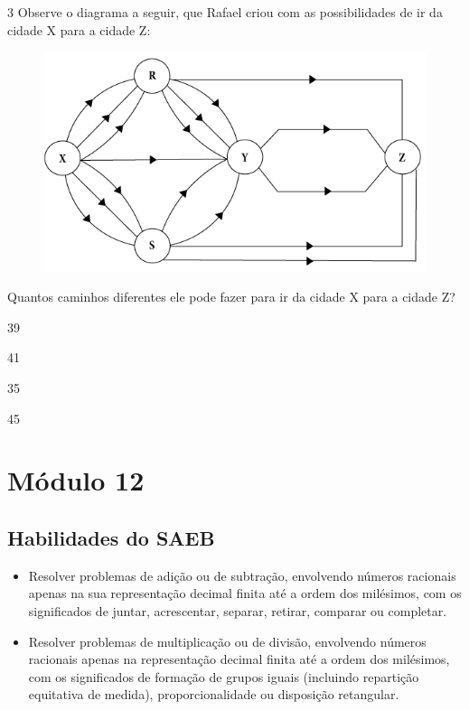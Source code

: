 \pagebreak
\num{3} Observe o diagrama a seguir, que Rafael criou com as possibilidades de ir da cidade X para a cidade Z:

\begin{figure}[htpb!]
\centering
\includegraphics[width=\textwidth]{../ilustracoes/MAT5/SAEB_5ANO_MAT_figura84.png}
\end{figure}

Quantos caminhos diferentes ele pode fazer para ir da cidade X para a
cidade Z?

\begin{minipage}{.5\textwidth}
\begin{escolha}
\item
  39
\item
  41
\item
  35
\item
  45
\end{escolha}
\end{minipage}


\chapter{Módulo 12}

\section*{Habilidades do SAEB}

\begin{itemize}
\item Resolver problemas de adição ou de subtração, envolvendo números
racionais apenas na sua representação decimal finita até a ordem dos
milésimos, com os significados de juntar, acrescentar, separar, retirar,
comparar ou completar.

\item Resolver problemas de multiplicação ou de divisão, envolvendo números
racionais apenas na representação decimal finita até a ordem dos
milésimos, com os significados de formação de grupos iguais (incluindo
repartição equitativa de medida), proporcionalidade ou disposição
retangular.
\end{itemize}

